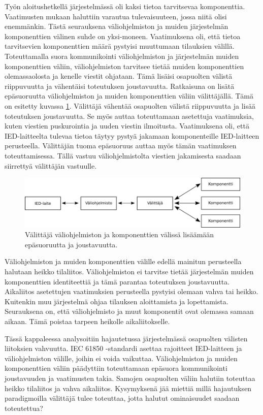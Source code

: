 Työn aloitushetkellä järjestelmässä oli kaksi tietoa tarvitsevaa komponenttia. Vaatimusten mukaan haluttiin varautua tulevaisuuteen, jossa niitä olisi enemmänkin. Tästä seurauksena väliohjelmiston ja muiden järjestelmän komponenttien välinen suhde on yksi-moneen. Vaatimuksena oli, että tietoa tarvitsevien komponenttien määrä pystyisi muuttumaan tilauksien välillä. Toteuttamalla suora kommunikointi väliohjelmiston ja järjestelmän muiden komponenttien väliin, väliohjelmiston tarvitsee tietää muiden komponenttien olemassaolosta ja kenelle viestit ohjataan. Tämä lisäisi osapuolten välistä riippuvuutta ja vähentäisi toteutuksen joustavuutta. Ratkaisuna on lisätä epäsuoruutta väliohjelmiston ja muiden komponenttien väliin välittäjällä. Tämä on esitetty kuvassa \ref{fig:coupling-analysis}. Välittäjä vähentää osapuolten välistä riippuvuutta ja lisää toteutuksen joustavuutta. Se myös auttaa toteuttamaan asetettuja vaatimuksia, kuten viestien puskurointia ja uuden viestin ilmoitusta. Vaatimuksena oli, että IED-laitteelta tulevaa tietoa täytyy pystyä jakamaan komponenteille IED-laitteen perusteella. Välittäjän tuoma epäsuoruus auttaa myös tämän vaatimuksen toteuttamisessa. Tällä vastuu väliohjelmistolta viestien jakamisesta saadaan siirrettyä välittäjän vastuulle.

\begin{figure}[ht!]
	\includegraphics[width=1\textwidth]{pictures/coupling-analysis.png}
	\caption{Välittäjä väliohjelmiston ja komponenttien välissä lisäämään epäsuoruutta ja joustavuutta.}
	\label{fig:coupling-analysis}
\end{figure}

Väliohjelmiston ja muiden komponenttien välille edellä mainitun perusteella halutaan heikko tilaliitos. Väliohjelmiston ei tarvitse tietää järjestelmän muiden komponenttien identiteettiä ja tämä parantaa toteutuksen joustavuutta. Aikaliitos asetettujen vaatimuksien perusteella pystyisi olemaan vahva tai heikko. Kuitenkin muu järjestelmä ohjaa tilauksen aloittamista ja lopettamista. Seurauksena on, että väliohjelmisto ja muut komponentit ovat olemassa samaan aikaan. Tämä poistaa tarpeen heikolle aikaliitokselle.

Tässä kappaleessa analysoitiin hajautetussa järjestelmässä osapuolten välisten liitoksien vahvuutta. IEC 61850 -standardi asettaa rajoitteet IED-laitteen ja väliohjelmiston välille, joihin ei voida vaikuttaa. Väliohjelmiston ja muiden komponenttien väliin päädyttiin toteuttamaan epäsuora kommunikointi joustavuuden ja vaatimusten takia. Samojen osapuolten väliin halutiin toteuttaa heikko tilaliitos ja vahva aikaliitos. Kysymyksenä jää miettiä millä hajautuksen paradigmoilla välittäjä tulee toteuttaa, jotta halutut ominaisuudet saadaan toteutettua?


